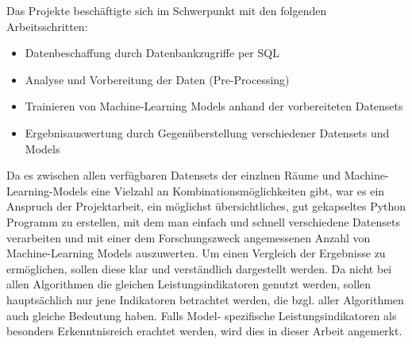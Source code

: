 
Das Projekte beschäftigte sich im Schwerpunkt mit den folgenden Arbeitsschritten:
\begin{itemize}
    \item Datenbeschaffung durch Datenbankzugriffe per SQL
    \item Analyse und Vorbereitung der Daten (Pre-Processing)
    \item Trainieren von Machine-Learning Models anhand der vorbereiteten Datensets
    \item Ergebnisauswertung durch Gegenüberstellung verschiedener Datensets und Models
\end{itemize}
Da es zwischen allen verfügbaren Datensets der einzlnen Räume und Machine-Learning-Models eine Vielzahl an
Kombinationsmöglichkeiten gibt, war es ein Anspruch der Projektarbeit, ein möglichst übersichtliches, 
gut gekapseltes Python Programm zu erstellen, mit dem man einfach und schnell verschiedene Datensets  
verarbeiten und mit einer dem Forschungszweck angemessenen Anzahl von Machine-Learning Models auszuwerten. 
Um einen Vergleich der Ergebnisse zu ermöglichen, sollen diese klar und verständlich dargestellt werden. 
Da nicht bei allen Algorithmen die gleichen Leistungsindikatoren genutzt werden, sollen hauptsächlich nur 
jene Indikatoren betrachtet werden, die bzgl. aller Algorithmen auch gleiche Bedeutung haben. Falls Model-
spezifische Leistungsindikatoren als besonders Erkenntnisreich erachtet werden, wird dies in dieser Arbeit
angemerkt.